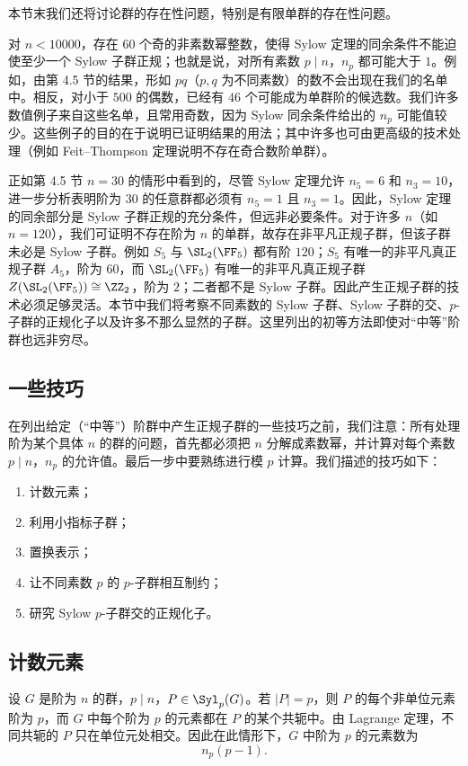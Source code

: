 本节末我们还将讨论群的存在性问题，特别是有限单群的存在性问题。

对 $n<10000$，存在 $60$ 个奇的非素数幂整数，使得 Sylow 定理的同余条件不能迫使至少一个 Sylow 子群正规；也就是说，对所有素数 $p\mid n$，$n_p$ 都可能大于 $1$。例如，由第 4.5 节的结果，形如 $pq$（$p,q$ 为不同素数）的数不会出现在我们的名单中。相反，对小于 $500$ 的偶数，已经有 $46$ 个可能成为单群阶的候选数。我们许多数值例子来自这些名单，且常用奇数，因为 Sylow 同余条件给出的 $n_p$ 可能值较少。这些例子的目的在于说明已证明结果的用法；其中许多也可由更高级的技术处理（例如 Feit--Thompson 定理说明不存在奇合数阶单群）。

正如第 4.5 节 $n=30$ 的情形中看到的，尽管 Sylow 定理允许 $n_5=6$ 和 $n_3=10$，进一步分析表明阶为 $30$ 的任意群都必须有 $n_5=1$ 且 $n_3=1$。因此，Sylow 定理的同余部分是 Sylow 子群正规的充分条件，但远非必要条件。对于许多 $n$（如 $n=120$），我们可证明不存在阶为 $n$ 的单群，故存在非平凡正规子群，但该子群未必是 Sylow 子群。例如 $S_5$ 与 $\SL_2(\FF_5)$ 都有阶 $120$；$S_5$ 有唯一的非平凡真正规子群 $A_5$，阶为 $60$，而 $\SL_2(\FF_5)$ 有唯一的非平凡真正规子群 $Z(\SL_2(\FF_5))\cong\ZZ_2$，阶为 $2$；二者都不是 Sylow 子群。因此产生正规子群的技术必须足够灵活。本节中我们将考察不同素数的 Sylow 子群、Sylow 子群的交、$p$-子群的正规化子以及许多不那么显然的子群。这里列出的初等方法即使对“中等”阶群也远非穷尽。

\subsection*{一些技巧}

在列出给定（“中等”）阶群中产生正规子群的一些技巧之前，我们注意：所有处理阶为某个具体 $n$ 的群的问题，首先都必须把 $n$ 分解成素数幂，并计算对每个素数 $p\mid n$，$n_p$ 的允许值。最后一步中要熟练进行模 $p$ 计算。我们描述的技巧如下：
\begin{enumerate}[label=(\arabic*)]
  \item 计数元素；
  \item 利用小指标子群；
  \item 置换表示；
  \item 让不同素数 $p$ 的 $p$-子群相互制约；
  \item 研究 Sylow $p$-子群交的正规化子。
\end{enumerate}

\subsection*{计数元素}

设 $G$ 是阶为 $n$ 的群，$p\mid n$，$P\in\Syl_p(G)$。若 $|P|=p$，则 $P$ 的每个非单位元素阶为 $p$，而 $G$ 中每个阶为 $p$ 的元素都在 $P$ 的某个共轭中。由 Lagrange 定理，不同共轭的 $P$ 只在单位元处相交。因此在此情形下，$G$ 中阶为 $p$ 的元素数为
\[
  n_p(p-1).
\]

